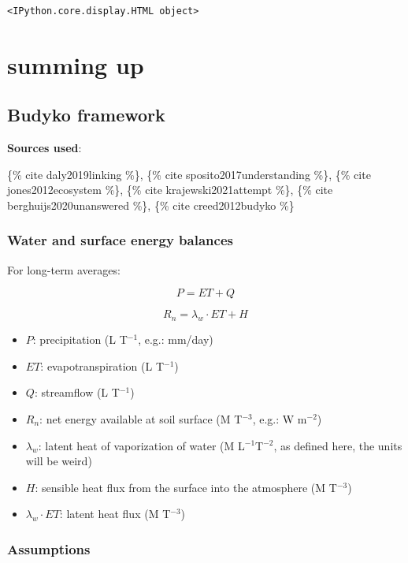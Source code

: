 \documentclass[
  letterpaper,
  DIV=11,
  numbers=noendperiod]{scrreprt}
\providecommand{\tightlist}{%
  \setlength{\itemsep}{0pt}\setlength{\parskip}{0pt}}\usepackage{longtable,booktabs,array}
\begin{document}
\begin{verbatim}
<IPython.core.display.HTML object>
\end{verbatim}

\part{summing up}

\hypertarget{budyko-framework}{%
\chapter{Budyko framework}\label{budyko-framework}}

\textbf{Sources used}:

\{\% cite daly2019linking \%\}, \{\% cite sposito2017understanding \%\},
\{\% cite jones2012ecosystem \%\}, \{\% cite krajewski2021attempt \%\},
\{\% cite berghuijs2020unanswered \%\}, \{\% cite creed2012budyko \%\}

\hypertarget{water-and-surface-energy-balances}{%
\section{Water and surface energy
balances}\label{water-and-surface-energy-balances}}

For long-term averages:

\[
P = ET+Q
\]

\[
R_n = \lambda_w\cdot ET + H
\]

\begin{itemize}
\tightlist
\item
  \(P\): precipitation (L T\(^{-1}\), e.g.: mm/day)
\item
  \(ET\): evapotranspiration (L T\(^{-1}\))
\item
  \(Q\): streamflow (L T\(^{-1}\))
\item
  \(R_n\): net energy available at soil surface (M T\(^{-3}\), e.g.: W
  m\(^{-2}\))
\item
  \(\lambda_w\): latent heat of vaporization of water (M
  L\(^{-1}\)T\(^{-2}\), as defined here, the units will be weird)
\item
  \(H\): sensible heat flux from the surface into the atmosphere (M
  T\(^{-3}\))
\item
  \(\lambda_w \cdot ET\): latent heat flux (M T\(^{-3}\))
\end{itemize}

\hypertarget{assumptions}{%
\section{Assumptions}\label{assumptions}}
\end{document}
